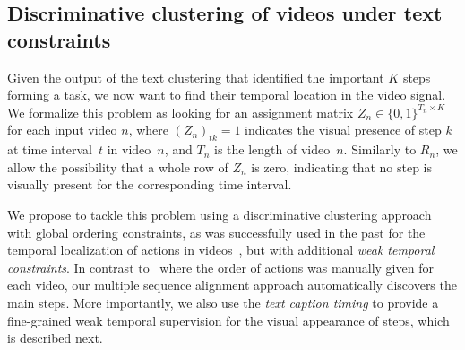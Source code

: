 \documentclass[10pt,twocolumn,letterpaper]{article}
\begin{document}
\subsection{Discriminative clustering of videos under text constraints}
\label{sec:model-video}

Given the output of the text clustering that identified the important $K$ steps forming a task,
we now want to find their temporal location in the video signal. We formalize this problem
as looking for an assignment matrix $Z_n\in \{0, 1\}^{T_n \times K}$ for each input video $n$,
where $(Z_n)_{tk} = 1$ indicates the visual presence of step $k$ at time interval~$t$ in video~$n$, and $T_n$ is the length of video~$n$.
Similarly to $R_n$, we allow the possibility that a whole row of $Z_n$ is zero, indicating that no step 
is visually present for the corresponding time interval.

We propose to tackle this problem using a discriminative clustering approach with global
ordering constraints, as was successfully used in the past
for the temporal localization of actions in videos~\cite{Bojanowski14weakly}, 
but with additional \emph{weak temporal constraints}.
In contrast to~\cite{Bojanowski14weakly} where the order of actions was manually
given for each video, our multiple sequence alignment approach automatically
discovers the main steps. More importantly, we also use the \emph{text caption timing}
to provide a fine-grained weak temporal supervision for the visual 
appearance of steps, which is described next.
\end{document}

